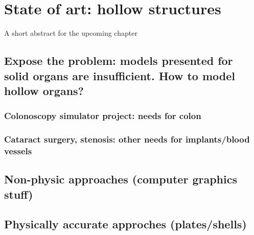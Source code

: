 \chapter{State of art: hollow structures}
\label{chap7}
\begin{shortAbstract}
A short abstract for the upcoming chapter
\end{shortAbstract}


\section{Expose the problem: models presented for solid organs are insufficient. How to model hollow organs?}
	\subsection{Colonoscopy simulator project: needs for colon}
	\subsection{Cataract surgery, stenosis: other needs for implants/blood vessels}
		
\section{Non-physic approaches (computer graphics stuff)}
		
\section{Physically accurate approches (plates/shells)}

